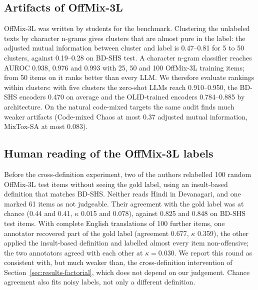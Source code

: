 \subsection{Artifacts of OffMix-3L}
\label{sec:appendix-artifacts}
OffMix-3L was written by students for the benchmark. Clustering the unlabeled texts by character n-grams gives clusters
that are almost pure in the label: the adjusted mutual information between cluster and label is 0.47--0.81 for 5 to 50
clusters, against 0.19--0.28 on BD-SHS test. A character n-gram classifier reaches AUROC 0.938, 0.976 and 0.993 with 25,
50 and 100 OffMix-3L training items; from 50 items on it ranks better than every LLM. We therefore evaluate rankings within clusters: with five clusters
the zero-shot LLMs reach 0.910--0.950, the BD-SHS encoders 0.470 on average and the OLID-trained encoders 0.784--0.885 by
architecture. On the natural code-mixed targets the same audit finds much weaker artifacts (Code-mixed Chaos at most
0.37 adjusted mutual information, MixTox-SA at most 0.083).

\subsection{Human reading of the OffMix-3L labels}
Before the cross-definition experiment, two of the authors relabelled 100 random OffMix-3L test items without seeing the
gold label, using an insult-based definition that matches BD-SHS. Neither reads Hindi in Devanagari, and one marked 61
items as not judgeable. Their agreement with the gold label was at chance (0.44 and
0.41, $\kappa$ 0.015 and 0.078), against 0.825 and 0.848 on BD-SHS test items. With complete English translations of 100
further items, one annotator recovered part of the gold label (agreement 0.677, $\kappa$ 0.359), the other applied the
insult-based definition and labelled almost every item non-offensive; the two annotators agreed with each other at
$\kappa = 0.030$. We report this round as consistent with, but much weaker than, the cross-definition intervention of
Section~\ref{sec:results-factorial}, which does not depend on our judgement. Chance agreement also fits noisy labels, not
only a different definition.

